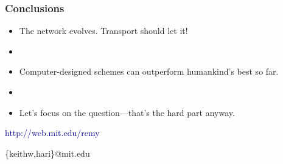 \documentclass[svgnames]{beamer}
\newcommand{\ssline}{\vspace{8 pt}}
\begin{document}
\begin{frame}
\frametitle{Conclusions}

\large

\begin{itemize}

\item The network evolves. Transport should let it!

\item[]

\item Computer-designed schemes can outperform humankind's best so far.

\item[]

\item Let's focus on the question---that's the hard part anyway.

\end{itemize}

\ssline

\begin{centering}

\textcolor{DarkBlue}{http://web.mit.edu/remy}

\vspace{\baselineskip}

\{keithw,hari\}@mit.edu

\end{centering}

\end{frame}
\end{document}
